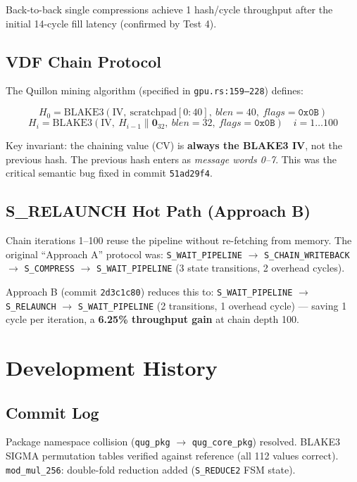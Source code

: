 \documentclass[11pt,a4paper]{article}
\begin{document}
Back-to-back single compressions achieve 1 hash/cycle throughput
after the initial 14-cycle fill latency (confirmed by Test 4).

\subsection{VDF Chain Protocol}

The Quillon mining algorithm (specified in \texttt{gpu.rs:159--228}) defines:

\[
H_0 = \text{BLAKE3}(\text{IV},\ \text{scratchpad}[0{:}40],\ \textit{blen}=40,\ \textit{flags}=\texttt{0x0B})
\]
\[
H_i = \text{BLAKE3}(\text{IV},\ H_{i-1} \| \mathbf{0}_{32},\ \textit{blen}=32,\ \textit{flags}=\texttt{0x0B}) \quad i=1\ldots100
\]

Key invariant: the chaining value (CV) is \textbf{always the BLAKE3 IV},
not the previous hash. The previous hash enters as \emph{message words 0--7}.
This was the critical semantic bug fixed in commit \texttt{51ad29f4}.

\subsection{S\_RELAUNCH Hot Path (Approach B)}

Chain iterations 1--100 reuse the pipeline without re-fetching from memory.
The original ``Approach A'' protocol was:
\texttt{S\_WAIT\_PIPELINE} $\to$ \texttt{S\_CHAIN\_WRITEBACK} $\to$ \texttt{S\_COMPRESS} $\to$
\texttt{S\_WAIT\_PIPELINE} (3 state transitions, 2 overhead cycles).

Approach B (commit \texttt{2d3c1c80}) reduces this to:
\texttt{S\_WAIT\_PIPELINE} $\to$ \texttt{S\_RELAUNCH} $\to$ \texttt{S\_WAIT\_PIPELINE}
(2 transitions, 1 overhead cycle) --- saving 1 cycle per iteration,
a \textbf{6.25\% throughput gain} at chain depth 100.

\section{Development History}

\subsection{Commit Log}

\begin{commitbox}
Package namespace collision (\texttt{qug\_pkg} $\to$ \texttt{qug\_core\_pkg}) resolved.
BLAKE3 SIGMA permutation tables verified against reference (all 112 values correct).
\texttt{mod\_mul\_256}: double-fold reduction added (\texttt{S\_REDUCE2} FSM state).
\end{commitbox}
\end{document}
